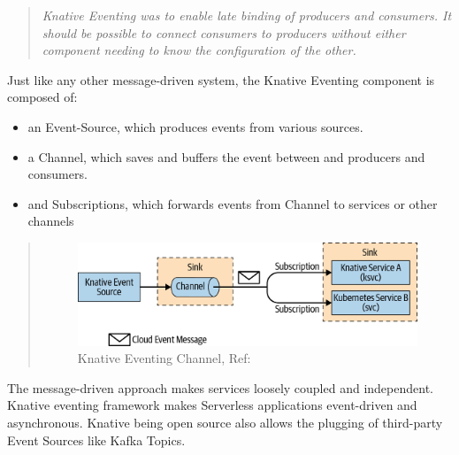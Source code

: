 \documentclass{article}
\begin{document}
\begin{flushleft}
\begin{quote}
\textit{Knative Eventing was to enable late binding of producers and consumers. It should be possible to connect consumers to producers without either component needing to know the configuration of the other.}
\end{quote}
\begin{flushright}
\cite{cncf_to_host_cloudevents_in_the_sandbox_2023}
\end{flushright}
 \hfill\break   
Just like any other message-driven system, the Knative Eventing component is composed of:
\begin{itemize}
    \item an Event-Source, which produces events from various sources.
    \item a Channel, which saves and buffers the event between and producers and consumers.
    \item 	and Subscriptions, which forwards events from Channel to services or other channels
\end{itemize}
\begin{quote}
\begin{figure}[h]
    \centering
    \includegraphics[width=0.5\linewidth]{images/knative-event-channel.png}
    \caption{Knative Eventing Channel,  Ref: \cite{Sutter_Sampath_2020}}
    \end{figure}
\end{quote}

The message-driven approach makes services loosely coupled and independent. Knative eventing framework makes Serverless applications event-driven and asynchronous. Knative being open source also allows the plugging of third-party Event Sources like Kafka Topics. 

\end{flushleft}
\end{document}
